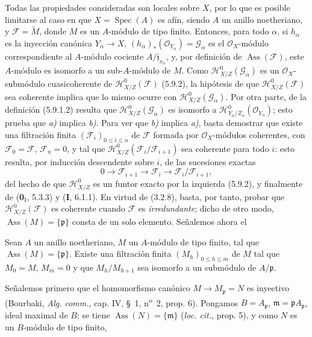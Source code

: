 Todas las propiedades consideradas son locales sobre $X$, por lo que es posible
limitarse al caso en que $X=\operatorname{Spec}(A)$ es afín, siendo $A$ un
anillo noetheriano, y $\mathcal F=\widetilde M$, donde $M$ es un $A$-módulo
de tipo finito. Entonces, para todo $\alpha$, si $h_\alpha$ es la inyección
canónica $Y_\alpha\to X$,
$(h_\alpha)_*(\mathcal O_{Y_\alpha})=\mathcal G_\alpha$ es el
$\mathcal O_X$-módulo correspondiente al $A$-módulo cociente
$A/\mathfrak j_{x_\alpha}$, y, por definición de
$\operatorname{Ass}(\mathcal F)$, este $A$-módulo es isomorfo a un
sub-$A$-módulo de $M$. Como $\mathcal H^0_{X/Z}(\mathcal G_\alpha)$ es un
$\mathcal O_X$-submódulo cuasicoherente de
$\mathcal H^0_{X/Z}(\mathcal F)$ (5.9.2), la hipótesis de que
$\mathcal H^0_{X/Z}(\mathcal F)$ sea coherente implica que lo mismo ocurre con
$\mathcal H^0_{X/Z}(\mathcal G_\alpha)$. Por otra parte, de la
definición (5.9.1.2) resulta que $\mathcal H^0_{X/Z}(\mathcal G_\alpha)$ es
isomorfo a
$\mathcal H^0_{Y_\alpha/Z_\alpha}(\mathcal O_{Y_\alpha})$;
esto prueba que \emph{a)} implica \emph{b)}. Para ver que \emph{b)} implica \emph{a)}, basta demostrar que
existe una filtración finita $(\mathcal F_i)_{0\leq i\leq n}$ de
$\mathcal F$ formada por $\mathcal O_X$-módulos coherentes, con
$\mathcal F_0=\mathcal F$, $\mathcal F_n=0$, y tal que
$\mathcal H^0_{X/Z}(\mathcal F_i/\mathcal F_{i+1})$ sea coherente para todo
$i$: esto resulta, por inducción descendente sobre $i$, de las sucesiones
exactas
\[
0\longrightarrow\mathcal F_{i+1}\longrightarrow\mathcal F_i
\longrightarrow\mathcal F_i/\mathcal F_{i+1},
\]
del hecho de que $\mathcal H^0_{X/Z}$ es un funtor exacto por la izquierda
(5.9.2), y finalmente de (\textbf 0$_\mathrm I$, 5.3.3) y (\textbf I, 6.1.1). En virtud de
(3.2.8), basta, por tanto, probar que
$\mathcal H^0_{X/Z}(\mathcal F)$ es coherente cuando $\mathcal F$ es
\emph{irredundante}; dicho de otro modo,
$\operatorname{Ass}(M)=\{\mathfrak p\}$ consta de un solo elemento. Señalemos
ahora el

\begin{lemma}[5.11.1.1]
\label{IV.2.s5.11.1.1-fr}
Sean $A$ un anillo noetheriano, $M$ un $A$-módulo de tipo finito, tal que
$\operatorname{Ass}(M)=\{\mathfrak p\}$. Existe una filtración finita
$(M_h)_{0\leq h\leq m}$ de $M$ tal que $M_0=M$, $M_m=0$ y que
$M_h/M_{h+1}$ sea isomorfo a un submódulo de $A/\mathfrak p$.
\end{lemma}

Señalemos primero que el homomorfismo canónico $M\to M_\mathfrak p=N$ es
inyectivo (Bourbaki, \emph{Alg. comm.}, cap. IV, \S~1, n\textsuperscript{o}~2,
prop. 6). Pongamos $B=A_\mathfrak p$, $\mathfrak m=\mathfrak pA_\mathfrak p$,
ideal maximal de $B$; se tiene $\operatorname{Ass}(N)=\{\mathfrak m\}$
(\emph{loc. cit.}, prop. 5), y como $N$ es un $B$-módulo de tipo finito,


